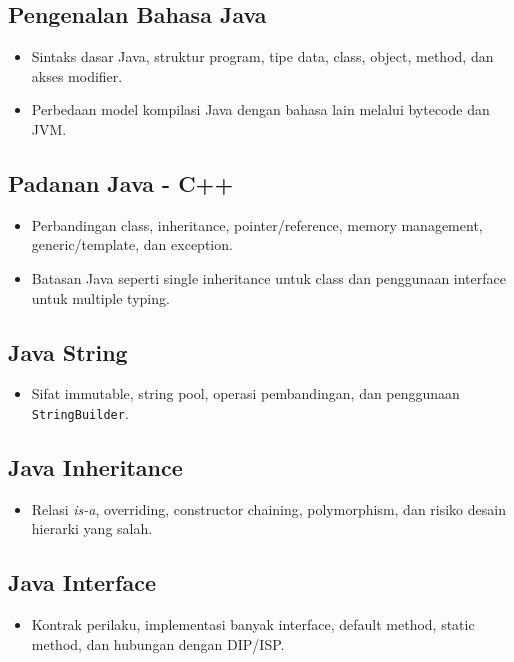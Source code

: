 \documentclass[11pt,a4paper]{article}
\begin{document}
\subsection{Pengenalan Bahasa Java}
\begin{itemize}
    \item Sintaks dasar Java, struktur program, tipe data, class, object, method, dan akses modifier.
    \item Perbedaan model kompilasi Java dengan bahasa lain melalui bytecode dan JVM.
\end{itemize}

\subsection{Padanan Java - C++}
\begin{itemize}
    \item Perbandingan class, inheritance, pointer/reference, memory management, generic/template, dan exception.
    \item Batasan Java seperti single inheritance untuk class dan penggunaan interface untuk multiple typing.
\end{itemize}

\subsection{Java String}
\begin{itemize}
    \item Sifat immutable, string pool, operasi pembandingan, dan penggunaan \texttt{StringBuilder}.
\end{itemize}

\subsection{Java Inheritance}
\begin{itemize}
    \item Relasi \textit{is-a}, overriding, constructor chaining, polymorphism, dan risiko desain hierarki yang salah.
\end{itemize}

\subsection{Java Interface}
\begin{itemize}
    \item Kontrak perilaku, implementasi banyak interface, default method, static method, dan hubungan dengan DIP/ISP.
\end{itemize}
\end{document}
